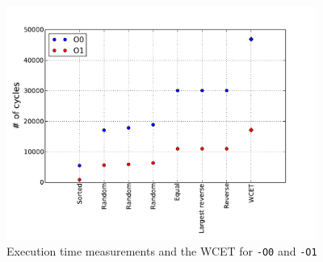 \documentclass[12pt,a4paper,titlepage,oneside]{article}
\begin{document}
\begin{itemize}
\begin{figure}%
  \centering
  \includegraphics[width=4in]{q2_3}
  \caption
  {Execution time measurements and the WCET for \texttt{-O0} and
  \texttt{-O1}}
	\label{fig:opt_compare}
\end{figure}



\end{itemize}
\end{document}
